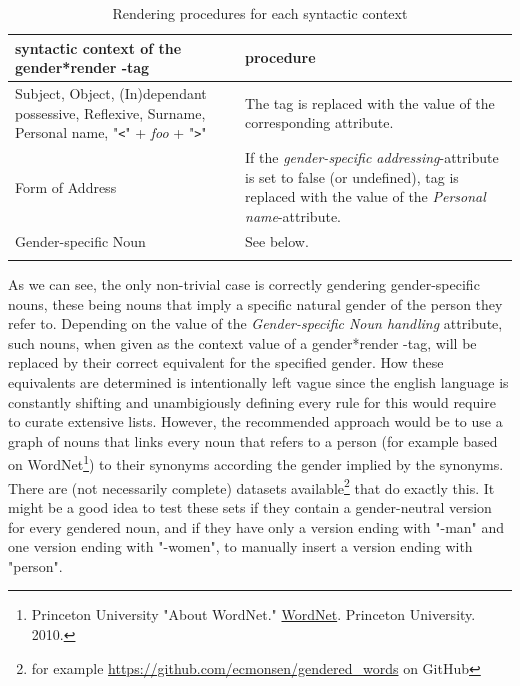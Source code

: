 \documentclass{article}
\newcommand{\GenderRender}{
    gender*render
}
\begin{document}
    \begin{flushleft}
        \begin{center}
            \begin{longtable}{|>{\raggedright\arraybackslash}p{8em} | >{\raggedright\arraybackslash}p{28em} |}
                 \hline
                 syntactic context of the \GenderRender-tag & procedure\\
                 \hline
                 \hline
                 Subject, Object, (In)dependant possessive, Reflexive, Surname, Personal name, "\texttt{<}" + \emph{foo} + "\texttt{>}" & The tag is replaced with the value of the corresponding attribute. \\
                 \hline
                 Form of Address & If the \emph{gender-specific addressing}-attribute  is set to false (or undefined), tag is replaced with the value of the \emph{Personal name}-attribute.  \\
                 \hline
                 Gender-specific Noun & See below. \\
                 \hline
                \caption{Rendering procedures for each syntactic context}
            \end{longtable}
        \end{center}
    \end{flushleft}

    As we can see, the only non-trivial case is correctly gendering gender-specific nouns, these being nouns that imply a specific natural gender of the person they refer to.
    Depending on the value of the \emph{Gender-specific Noun handling} attribute, such nouns, when given as the context value of a \GenderRender-tag, will be replaced by their correct equivalent for the specified gender.
    How these equivalents are determined is intentionally left vague since the english language is constantly shifting and unambigiously defining every rule for this would require to curate extensive lists.
    However, the recommended approach would be to use a graph of nouns that links every noun that refers to a person (for example based on WordNet\footnote{Princeton University "About WordNet." \href{https://wordnet.princeton.edu/}{WordNet}. Princeton University. 2010.}) to their synonyms according the gender implied by the synonyms.
    There are (not necessarily complete) datasets available\footnote{for example \url{https://github.com/ecmonsen/gendered_words} on GitHub} that do exactly this.
    It might be a good idea to test these sets if they contain a gender-neutral version for every gendered noun, and if they have only a version ending with "-man" and one version ending with "-women", to manually insert a version ending with "person".\\
\end{document}
